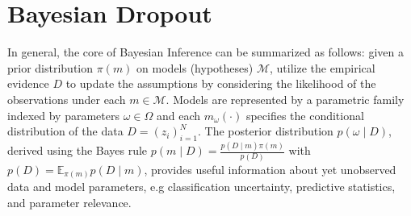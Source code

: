 \documentclass[a4paper,10pt]{article}
\begin{document}


\section{Bayesian Dropout} %
\label{sec:bayesian_dropout}

In general, the core of Bayesian Inference can be summarized as follows: given a prior
distribution $\pi(m)$ on models (hypotheses) $\mathcal{M}$, utilize the empirical evidence
$D$ to update the assumptions by considering the likelihood of the observations under each
$m \in \mathcal{M}$. Models are represented by a parametric family indexed by parameters
$\omega \in \Omega$ and each $m_\omega(\cdot)$ specifies the conditional distribution of
the data $
  D = (z_i)_{i=1}^N
$. The posterior distribution $p(\omega \mid D)$, derived using the Bayes rule $
  p(m \mid D) = \tfrac{p(D \mid m) \pi(m)}{p(D)}
$ with $
  p(D) = \mathbb{E}_{\pi(m)} p(D \mid m)
$, provides useful information about yet unobserved data and model parameters, e.g
classification uncertainty, predictive statistics, and parameter relevance.
\end{document}
